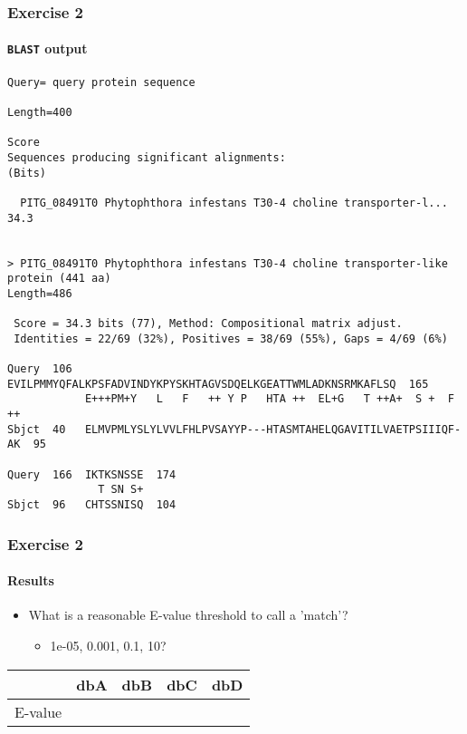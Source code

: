 \begin{frame}[fragile]
  \frametitle{Exercise 2}
  \framesubtitle{\texttt{BLAST} output}
  \begin{tiny}
  \begin{verbatim}
Query= query protein sequence

Length=400
                                                                      Score
Sequences producing significant alignments:                          (Bits)

  PITG_08491T0 Phytophthora infestans T30-4 choline transporter-l...  34.3


> PITG_08491T0 Phytophthora infestans T30-4 choline transporter-like 
protein (441 aa)
Length=486

 Score = 34.3 bits (77), Method: Compositional matrix adjust.
 Identities = 22/69 (32%), Positives = 38/69 (55%), Gaps = 4/69 (6%)

Query  106  EVILPMMYQFALKPSFADVINDYKPYSKHTAGVSDQELKGEATTWMLADKNSRMKAFLSQ  165
            E+++PM+Y   L   F   ++ Y P   HTA ++  EL+G   T ++A+  S +  F ++
Sbjct  40   ELMVPMLYSLYLVVLFHLPVSAYYP---HTASMTAHELQGAVITILVAETPSIIIQF-AK  95

Query  166  IKTKSNSSE  174
              T SN S+
Sbjct  96   CHTSSNISQ  104
  \end{verbatim}   
  \end{tiny} 
\end{frame}

\begin{frame}
  \frametitle{Exercise 2}
  \framesubtitle{Results}
  \begin{itemize}
    \item What is a reasonable E-value threshold to call a 'match'?
    \begin{itemize}
      \item 1e-05, 0.001, 0.1, 10?
    \end{itemize}
  \end{itemize}
  \begin{center}
  \begin{tabular}{r|l|l|l|l}
            & dbA & dbB & dbC & dbD \\
	  \hline
	  \hline
	  E-value &      &  &  & \\
  \end{tabular}
  \end{center}
\end{frame}

